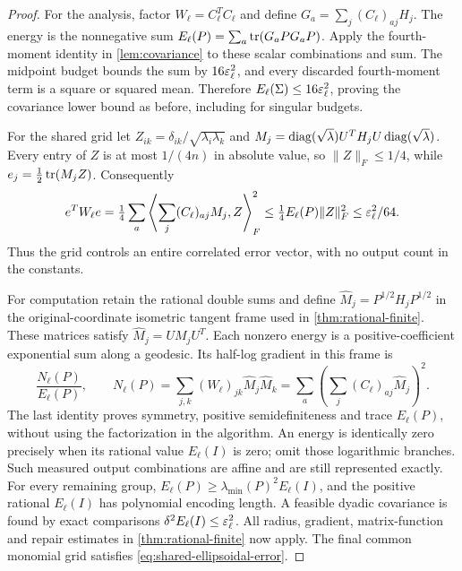\begin{proof}
For the analysis, factor $W_\ell=C_\ell^TC_\ell$ and define
$G_a=\sum_j(C_\ell)_{aj}H_j$. The energy is the nonnegative sum
$E_\ell(P)=\sum_a\operatorname{tr}(G_aPG_aP)$. Apply the fourth-moment identity
in \cref{lem:covariance} to these scalar combinations and sum. The
midpoint budget bounds the sum by $16\varepsilon_\ell^2$, and every discarded
fourth-moment term is a square or squared mean. Therefore
$E_\ell(\Sigma)\le16\varepsilon_\ell^2$, proving the covariance lower bound
as before, including for singular budgets.

For the shared grid let
$Z_{ik}=\delta_{ik}/\sqrt{\lambda_i\lambda_k}$ and
$M_j=\operatorname{diag}(\sqrt\lambda)U^TH_jU\operatorname{diag}(\sqrt\lambda)$. Every entry of
$Z$ is at most $1/(4n)$ in absolute value, so $\|Z\|_F\le1/4$, while
$e_j=\frac12\operatorname{tr}(M_jZ)$. Consequently
\begin{equation}\label{eq:shared-ellipsoidal-error}
 e^TW_\ell e
 =\tfrac14\sum_a\left\langle\sum_j(C_\ell)_{aj}M_j,Z\right\rangle_F^2
 \le\tfrac14E_\ell(P)\|Z\|_F^2\le\varepsilon_\ell^2/64.
\end{equation}
Thus the grid controls an entire correlated error vector, with no output
count in the constants.

For computation retain the rational double sums and define
$\widehat M_j=P^{1/2}H_jP^{1/2}$ in the original-coordinate isometric
tangent frame used in \cref{thm:rational-finite}. These matrices satisfy
$\widehat M_j=UM_jU^T$. Each nonzero energy is a positive-coefficient
exponential sum along a geodesic. Its half-log gradient in this frame is
\[
 \frac{N_\ell(P)}{E_\ell(P)},\qquad
 N_\ell(P)=\sum_{j,k}(W_\ell)_{jk}\widehat M_j\widehat M_k
       =\sum_a\left(\sum_j(C_\ell)_{aj}\widehat M_j\right)^2.
\]
The last identity proves symmetry, positive semidefiniteness and trace
$E_\ell(P)$, without using the factorization in the algorithm. An energy
is identically zero precisely when its rational value $E_\ell(I)$ is
zero; omit those logarithmic branches. Such measured output combinations
are affine and are still represented exactly. For every remaining group,
$E_\ell(P)\ge\lambda_{\min}(P)^2E_\ell(I)$, and the positive rational
$E_\ell(I)$ has polynomial encoding length. A feasible dyadic covariance
is found by exact comparisons $\delta^2E_\ell(I)\le\varepsilon_\ell^2$.
All radius, gradient, matrix-function and repair estimates in
\cref{thm:rational-finite} now apply. The final common monomial grid
satisfies \eqref{eq:shared-ellipsoidal-error}.
\end{proof}

